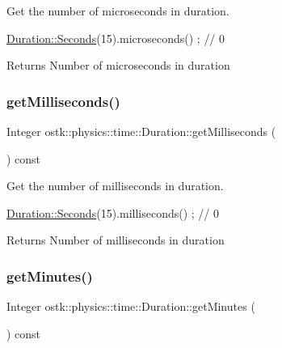 Get the number of microseconds in duration. 


\begin{DoxyCode}
\hyperlink{classostk_1_1physics_1_1time_1_1_duration_ad973fa34fcc308fdcc8d50c3ee694764}{Duration::Seconds}(15).microseconds() ; \textcolor{comment}{// 0}
\end{DoxyCode}


\begin{DoxyReturn}{Returns}
Number of microseconds in duration 
\end{DoxyReturn}
\mbox{\label{classostk_1_1physics_1_1time_1_1_duration_a4ff289a3d0fb16c73899adcfe381a111}} 
\subsubsection{\texorpdfstring{get\+Milliseconds()}{getMilliseconds()}}
{\footnotesize\ttfamily Integer ostk\+::physics\+::time\+::\+Duration\+::get\+Milliseconds (\begin{DoxyParamCaption}{ }\end{DoxyParamCaption}) const}



Get the number of milliseconds in duration. 


\begin{DoxyCode}
\hyperlink{classostk_1_1physics_1_1time_1_1_duration_ad973fa34fcc308fdcc8d50c3ee694764}{Duration::Seconds}(15).milliseconds() ; \textcolor{comment}{// 0}
\end{DoxyCode}


\begin{DoxyReturn}{Returns}
Number of milliseconds in duration 
\end{DoxyReturn}
\mbox{\label{classostk_1_1physics_1_1time_1_1_duration_a59eb18f0275a8683e73b9b86194bf9da}} 
\subsubsection{\texorpdfstring{get\+Minutes()}{getMinutes()}}
{\footnotesize\ttfamily Integer ostk\+::physics\+::time\+::\+Duration\+::get\+Minutes (\begin{DoxyParamCaption}{ }\end{DoxyParamCaption}) const}



